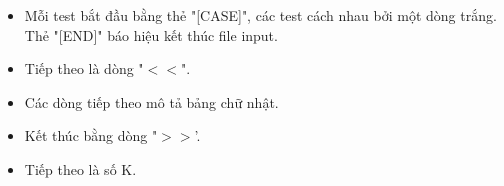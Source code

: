 \begin{itemize}
	\item     Mỗi test bắt đầu bằng thẻ "[CASE]", các test cách nhau bởi một dòng trắng. Thẻ "[END]" báo hiệu kết thúc file input.   
	\item     Tiếp theo là dòng "$<$$<$".   
	\item     Các dòng tiếp theo mô tả bảng chữ nhật.   
	\item     Kết thúc bằng dòng "$>$$>$'.   
	\item     Tiếp theo là số K.   
\end{itemize}